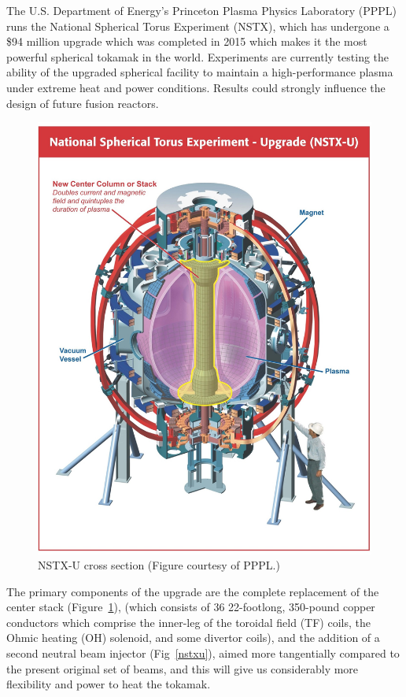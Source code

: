 \documentclass[12pt,lot, lof]{puthesis}
\begin{document}
The U.S. Department of Energy's Princeton Plasma Physics Laboratory (PPPL) runs the National Spherical Torus Experiment (NSTX), which has undergone a \$94 million upgrade which was completed in 2015 which makes it the most powerful spherical tokamak in the world. Experiments are currently testing the ability of the upgraded spherical facility to maintain a high-performance plasma under extreme heat and power conditions. Results could strongly influence the design of future fusion reactors.

\begin{figure}[htbp]
	\centering
	\includegraphics[width= 0.85\linewidth]{nstx3}
	\caption{NSTX-U cross section (Figure courtesy of PPPL.)}
	\label{nstx3}
\end{figure}

The primary components of the upgrade are the complete replacement of the center stack (Figure~\ref{nstx3}), (which consists of 36 22-footlong, 350-pound copper conductors which comprise the inner-leg of the toroidal field (TF) coils, the Ohmic heating (OH) solenoid, and some divertor coils), and the addition of a second neutral beam injector (Fig~\ref{nstxu}), aimed more tangentially compared to the present original set of beams, and this will give us considerably more flexibility and power to heat the tokamak.
\end{document}
